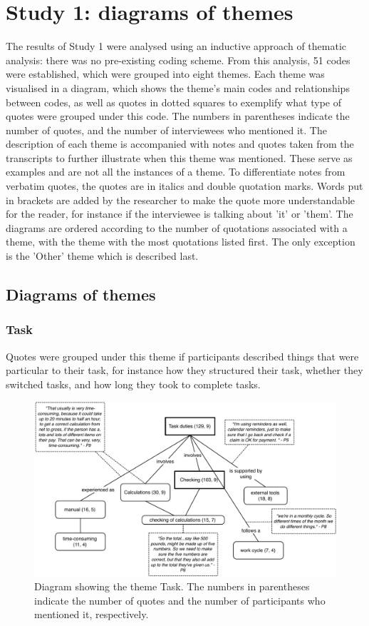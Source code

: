 \chapter{Study 1: diagrams of themes}\label{ch:S1_Diagrams}
The results of Study 1 were analysed using an inductive approach of thematic analysis: there was no pre-existing coding scheme. From this analysis, 51 codes were established, which were grouped into eight themes. Each theme was visualised in a diagram, which shows the theme's main codes and relationships between codes, as well as quotes in dotted squares to exemplify what type of quotes were grouped under this code. The numbers in parentheses indicate the number of quotes, and the number of interviewees who mentioned it. 
The description of each theme is accompanied with notes and quotes taken from the transcripts to further illustrate when this theme was mentioned. These serve as examples and are not all the instances of a theme. To differentiate notes from verbatim quotes, the quotes are in italics and double quotation marks. Words put in brackets are added by the researcher to make the quote more understandable for the reader, for instance if the interviewee is talking about 'it' or 'them'. The diagrams are ordered according to the number of quotations associated with a theme, with the theme with the most quotations listed first. The only exception is the 'Other' theme which is described last.

\newpage

\section{Diagrams of themes}
\subsection{Task}
Quotes were grouped under this theme if participants described things that were particular to their task, for instance how they structured their task, whether they switched tasks, and how long they took to complete tasks.

\begin{figure}[!ht]
\centering
\includegraphics[width=\textwidth]{images/ch12/Task.pdf}
\caption[Study 1 Task diagram]{Diagram showing the theme Task. The numbers in parentheses indicate the number of quotes and the number of participants who mentioned it, respectively.}
\vspace{-9pt}
\label{fig:ch3_task}
\end{figure}

